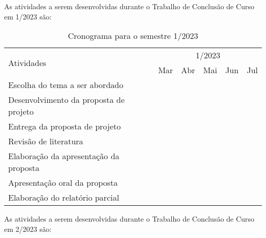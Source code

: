As atividades a serem desenvolvidas durante o Trabalho de Conclusão de Curso em 1/2023 são: 


		\begin{table}[H]
		\centering
		\footnotesize
		\caption{Cronograma para o semestre 1/2023}
			\begin{tabular}{|l|c|c|c|c|c|} \hline
				\multirow{2}{*}{Atividades} & \multicolumn{5}{c|}{1/2023} \\ \cline{2-6}				
				  & Mar & Abr & Mai & Jun & Jul \\ \hline	
			     
			    Escolha do tema a ser abordado    & \cellcolor{midgray} & & & & \\ \hline
		 	Desenvolvimento da proposta de projeto & & \cellcolor{midgray} & \cellcolor{midgray} & &\\ \hline     
				Entrega da proposta de projeto      &  &  & \cellcolor{midgray} & &\\ \hline        
				Revisão de literatura     & & & \cellcolor{midgray} & \cellcolor{midgray} & \cellcolor{midgray} \\ \hline      
				Elaboração da apresentação da proposta    & & & \cellcolor{midgray}  & &  \\ \hline        
				Apresentação oral da proposta    & & &\cellcolor{midgray}  & & \\ \hline        
				Elaboração do relatório parcial  & & & & \cellcolor{midgray}  & \cellcolor{midgray} \\ \hline
				
				
        	\end{tabular}
		\end{table}

 As atividades a serem desenvolvidas durante o Trabalho de Conclusão de Curso em 2/2023 são: 


